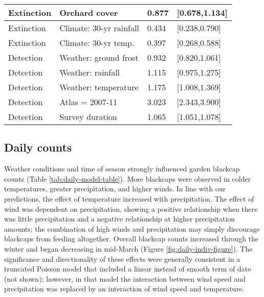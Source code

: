 \documentclass[a4paper, nobind]{templates/ociamthesis}
\begin{document}
\begin{longtable}{l|l|l|l}
\hline
Extinction & Orchard cover & 0.877 & [0.678,1.134]\\
\hline
Extinction & Climate: 30-yr rainfall & 0.434 & [0.238,0.790]\\
\hline
Extinction & Climate: 30-yr temp. & 0.397 & [0.268,0.588]\\
\hline
Detection & Weather: ground frost & 0.932 & [0.820,1.061]\\
\hline
Detection & Weather: rainfall & 1.115 & [0.975,1.275]\\
\hline
Detection & Weather: temperature & 1.175 & [1.008,1.369]\\
\hline
Detection & Atlas = 2007-11 & 3.023 & [2.343,3.900]\\
\hline
Detection & Survey duration & 1.065 & [1.051,1.078]\\
\hline
\end{longtable}
\endgroup{}

\hypertarget{daily-counts-1}{%
\subsection{Daily counts}\label{daily-counts-1}}

Weather conditions and time of season strongly influenced garden blackcap counts (Table \ref{tab:daily-model-table}). More blackcaps were observed in colder temperatures, greater precipitation, and higher winds. In line with our predictions, the effect of temperature increased with precipitation. The effect of wind was dependent on precipitation, showing a positive relationship when there was little precipitation and a negative relationship at higher precipitation amounts; the combination of high winds and precipitation may simply discourage blackcaps from feeding altogether. Overall blackcap counts increased through the winter and began decreasing in mid-March (Figure \ref{fig:daily-indiv-figure}). The significance and directionality of these effects were generally consistent in a truncated Poisson model that included a linear instead of smooth term of date (not shown); however, in that model the interaction between wind speed and precipitation was replaced by an interaction of wind speed and temperature.
\end{document}
